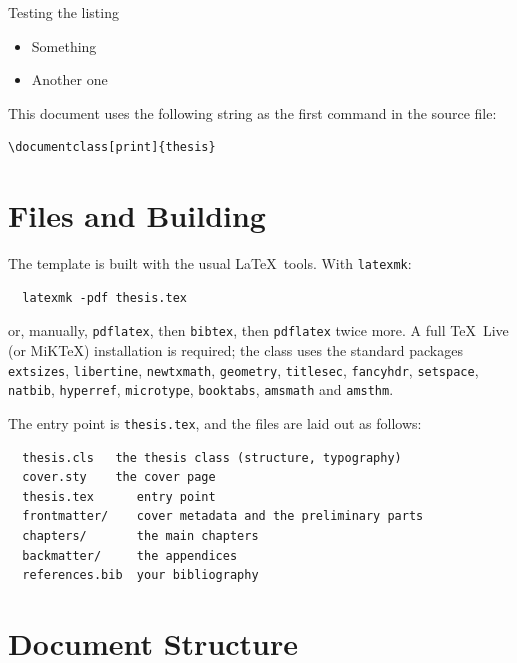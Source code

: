 Testing the listing
\begin{itemize}
  \item Something
  \item Another one
\end{itemize}

This document uses the following string as the first command in the
source file:
\begin{verbatim}
\documentclass[print]{thesis}
\end{verbatim}

\section{Files and Building}
\label{sec:files}

The template is built with the usual \LaTeX\ tools. With \texttt{latexmk}:
\begin{verbatim}
  latexmk -pdf thesis.tex
\end{verbatim}
or, manually, \verb|pdflatex|, then \verb|bibtex|, then \verb|pdflatex|
twice more. A full \TeX\ Live (or MiKTeX) installation is required; the
class uses the standard packages \texttt{extsizes}, \texttt{libertine},
\texttt{newtxmath}, \texttt{geometry}, \texttt{titlesec},
\texttt{fancyhdr}, \texttt{setspace}, \texttt{natbib}, \texttt{hyperref},
\texttt{microtype}, \texttt{booktabs}, \texttt{amsmath} and
\texttt{amsthm}.

The entry point is \texttt{thesis.tex}, and the files are laid out as
follows:
\begin{verbatim}
  thesis.cls   the thesis class (structure, typography)
  cover.sty    the cover page
  thesis.tex      entry point
  frontmatter/    cover metadata and the preliminary parts
  chapters/       the main chapters
  backmatter/     the appendices
  references.bib  your bibliography
\end{verbatim}

\section{Document Structure}
\label{sec:structure}

